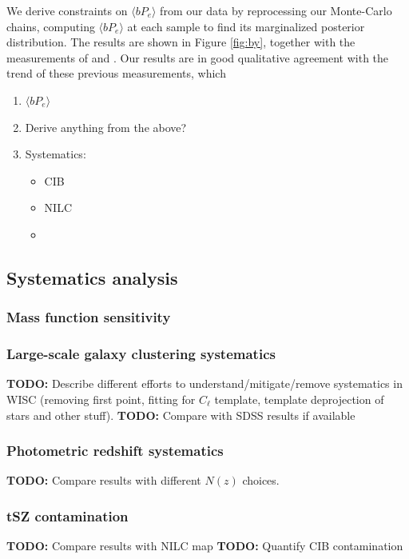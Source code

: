 \documentclass[useAMS,usenatbib]{mn2e}
\newcommand{\TODO}[1]{{\bf TODO:} #1}
\begin{document}
      We derive constraints on $\langle bP_e\rangle$ from our data by reprocessing our Monte-Carlo chains, computing $\langle bP_e\rangle$ at each sample to find its marginalized posterior distribution. The results are shown in Figure \ref{fig:by}, together with the measurements of \citep{2016A&A...594A..27P} and \cite{2019arXiv190413347P}. Our results are in good qualitative agreement with the trend of these previous measurements, which 

  \begin{enumerate}
    \item $\langle bP_e\rangle$
    \item Derive anything from the above?
    \item Systematics:
    \begin{itemize}
      \item CIB
      \item NILC
      \item 
    \end{itemize}
  \end{enumerate}

  \subsection{Systematics analysis}\label{ssec:results.syst}
    \subsubsection{Mass function sensitivity}\label{ssec:results.syst.massfunc}
    \subsubsection{Large-scale galaxy clustering systematics}\label{sssec:results.syst.gg}
      \TODO{Describe different efforts to understand/mitigate/remove systematics in WISC (removing first point, fitting for $C_\ell$ template, template deprojection of stars and other stuff).}
      \TODO{Compare with SDSS results if available}

    \subsubsection{Photometric redshift systematics}\label{sssec:results.syst.pz}
      \TODO{Compare results with different $N(z)$ choices.}

    \subsubsection{tSZ contamination}\label{sssec:results.syst.y}
      \TODO{Compare results with NILC map}
      \TODO{Quantify CIB contamination}
\end{document}
